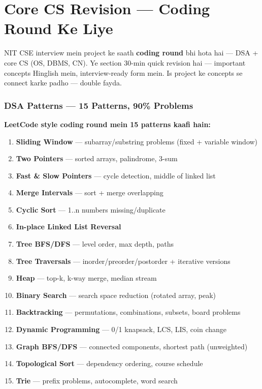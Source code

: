 \newpage

\part{Core CS Revision --- Coding Round Ke Liye}

\begin{storybox}
NIT CSE interview mein project ke saath \textbf{coding round} bhi hota hai --- DSA + core CS (OS, DBMS, CN). Ye section 30-min quick revision hai --- important concepts Hinglish mein, interview-ready form mein. Is project ke concepts se connect karke padho --- double fayda.
\end{storybox}

\section{DSA Patterns --- 15 Patterns, 90\% Problems}

\begin{conceptbox}
\textbf{LeetCode style coding round mein 15 patterns kaafi hain:}
\begin{enumerate}[label=\arabic*.]
\item \textbf{Sliding Window} --- subarray/substring problems (fixed + variable window)
\item \textbf{Two Pointers} --- sorted arrays, palindrome, 3-sum
\item \textbf{Fast \& Slow Pointers} --- cycle detection, middle of linked list
\item \textbf{Merge Intervals} --- sort + merge overlapping
\item \textbf{Cyclic Sort} --- 1..n numbers missing/duplicate
\item \textbf{In-place Linked List Reversal}
\item \textbf{Tree BFS/DFS} --- level order, max depth, paths
\item \textbf{Tree Traversals} --- inorder/preorder/postorder + iterative versions
\item \textbf{Heap} --- top-k, k-way merge, median stream
\item \textbf{Binary Search} --- search space reduction (rotated array, peak)
\item \textbf{Backtracking} --- permutations, combinations, subsets, board problems
\item \textbf{Dynamic Programming} --- 0/1 knapsack, LCS, LIS, coin change
\item \textbf{Graph BFS/DFS} --- connected components, shortest path (unweighted)
\item \textbf{Topological Sort} --- dependency ordering, course schedule
\item \textbf{Trie} --- prefix problems, autocomplete, word search
\end{enumerate}
\end{conceptbox}

